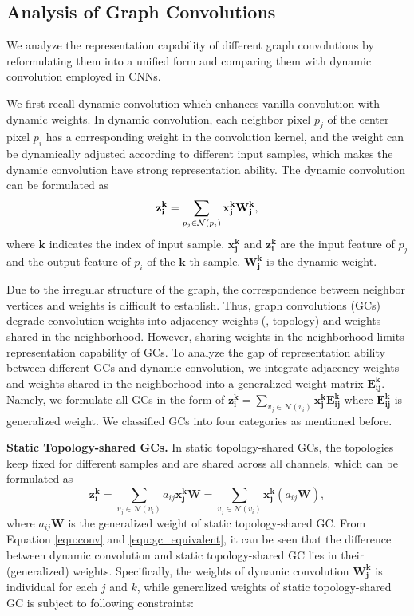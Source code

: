 \documentclass[10pt,twocolumn,letterpaper]{article}
\begin{document}
\subsection{Analysis of Graph Convolutions}
We analyze the representation capability of different graph convolutions by reformulating them into a unified form and comparing them with dynamic convolution \cite{chen2020dynamic,yang2019condconv} employed in CNNs.

We first recall dynamic convolution which enhances vanilla convolution with dynamic weights. In dynamic convolution, each neighbor pixel $p_j$ of the center pixel $p_i$ has a corresponding weight in the convolution kernel, and the weight can be dynamically adjusted according to different input samples, which makes the dynamic convolution have strong representation ability. The dynamic convolution can be formulated as
\vspace{-0.15cm}
\begin{equation}
\vspace{-0.15cm}
\mathbf{z_i^k}=\sum_{p_j \in \mathcal{N}(p_i)}\mathbf{x_j^k}\mathbf{W_j^k}, \label{equ:conv}
\end{equation}
where $\mathbf{k}$ indicates the index of input sample. $\mathbf{x_j^k}$ and $\mathbf{z_i^k}$ are the input feature of $p_j$ and the output feature of $p_i$ of the $\mathbf{k}$-th sample. $\mathbf{W_j^k}$ is the dynamic weight. 



Due to the irregular structure of the graph, the correspondence between neighbor vertices and weights is difficult to establish. Thus, graph convolutions (GCs) degrade convolution weights into adjacency weights (\ie, topology) and weights shared in the neighborhood. However, sharing weights in the neighborhood limits representation capability of GCs. To analyze the gap of representation ability between different GCs and dynamic convolution, we integrate adjacency weights and weights shared in the neighborhood into a generalized weight matrix $\mathbf{E^k_{ij}}$. Namely, we formulate all GCs in the form of $\mathbf{z_i^k}=\sum_{v_j \in \mathcal{N}(v_i)}\mathbf{x_j^k}\mathbf{E^k_{ij}}$ where $\mathbf{E^k_{ij}}$ is generalized weight. We classified GCs into four categories as mentioned before.

\noindent \textbf{Static Topology-shared GCs.} In static topology-shared GCs, the topologies keep fixed for different samples and are shared across all channels, which can be formulated as 
\begin{equation}
\mathbf{z_i^k}=\sum_{v_j \in \mathcal{N}(v_i)}a_{ij}\mathbf{x_j^k}\mathbf{W}=\sum_{v_j \in \mathcal{N}(v_i)}\mathbf{x_j^k}(a_{ij}\mathbf{W}), \label{equ:gc_equivalent}
\end{equation}
where  $a_{ij}\mathbf{W}$ is the generalized weight of static topology-shared GC. From Equation \ref{equ:conv} and \ref{equ:gc_equivalent}, it can be seen that the difference between dynamic convolution and static topology-shared GC lies in their (generalized) weights. Specifically, the weights of dynamic convolution $\mathbf{W_j^k}$ is individual for each $j$ and $k$, while generalized weights of static topology-shared GC is subject to following constraints:
\end{document}

